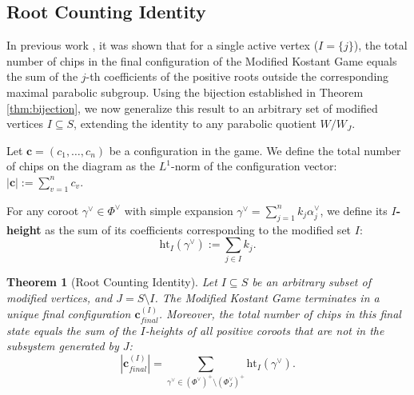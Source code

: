 \documentclass[11pt,a4paper]{amsart}
\theoremstyle{plain}
\newtheorem{theorem}{Theorem}[section]
\theoremstyle{definition}
\theoremstyle{remark}
\begin{document}

\subsection{Root Counting Identity}

In previous work \cite{CaviedesCastro2022}, it was shown that for a single active vertex ($I=\{j\}$), the total number of chips in the final configuration of the Modified Kostant Game equals the sum of the $j$-th coefficients of the positive roots outside the corresponding maximal parabolic subgroup. Using the bijection established in Theorem \ref{thm:bijection}, we now generalize this result to an arbitrary set of modified vertices $I \subseteq S$, extending the identity to any parabolic quotient $W/W_J$.

Let $\mathbf{c} = (c_1, \dots, c_n)$ be a configuration in the game. We define the total number of chips on the diagram as the $L^1$-norm of the configuration vector: $|\mathbf{c}| := \sum_{v=1}^n c_v$. 

For any coroot $\gamma^\vee \in \Phi^\vee$ with simple expansion $\gamma^\vee = \sum_{j=1}^n k_j \alpha_j^\vee$, we define its \textbf{$I$-height} as the sum of its coefficients corresponding to the modified set $I$:
\[
\mathrm{ht}_I(\gamma^\vee) := \sum_{j \in I} k_j .
\]

\begin{theorem}[Root Counting Identity]\label{thm:root_counting_identity}
	Let $I \subseteq S$ be an arbitrary subset of modified vertices, and $J = S \setminus I$. The Modified Kostant Game terminates in a unique final configuration $\mathbf{c}_{final}^{(I)}$. Moreover, the total number of chips in this final state equals the sum of the $I$-heights of all positive coroots that are not in the subsystem generated by $J$:
	\begin{equation}
		|\mathbf{c}_{final}^{(I)}| = \sum_{\gamma^\vee \in (\Phi^\vee)^+ \setminus (\Phi_J^\vee)^+} \mathrm{ht}_I(\gamma^\vee).
	\end{equation}
\end{theorem}
\end{document}
